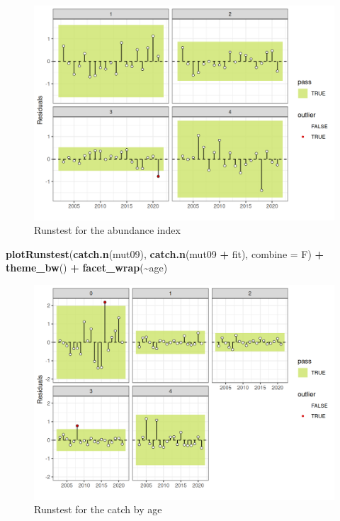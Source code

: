 \documentclass[
]{book}
\newenvironment{Shaded}{\begin{snugshade}}{\end{snugshade}}
\newcommand{\AttributeTok}[1]{\textcolor[rgb]{0.13,0.29,0.53}{#1}}
\newcommand{\FunctionTok}[1]{\textcolor[rgb]{0.13,0.29,0.53}{\textbf{#1}}}
\newcommand{\NormalTok}[1]{#1}
\newcommand{\SpecialCharTok}[1]{\textcolor[rgb]{0.81,0.36,0.00}{\textbf{#1}}}
\begin{document}
\begin{figure}
\centering
\includegraphics{_bookdown_files/_main_files/figure-html/idxrunstest-1.png}
\caption{\label{fig:idxrunstest}Runstest for the abundance index}
\end{figure}

\begin{Shaded}
\begin{Highlighting}[]
\FunctionTok{plotRunstest}\NormalTok{(}\FunctionTok{catch.n}\NormalTok{(mut09), }\FunctionTok{catch.n}\NormalTok{(mut09 }\SpecialCharTok{+}\NormalTok{ fit), }\AttributeTok{combine =}\NormalTok{ F) }\SpecialCharTok{+} \FunctionTok{theme\_bw}\NormalTok{() }\SpecialCharTok{+} \FunctionTok{facet\_wrap}\NormalTok{(}\SpecialCharTok{\textasciitilde{}}\NormalTok{age)}
\end{Highlighting}
\end{Shaded}

\begin{figure}
\centering
\includegraphics{_bookdown_files/_main_files/figure-html/catchrunstest-1.png}
\caption{\label{fig:catchrunstest}Runstest for the catch by age}
\end{figure}
\end{document}
